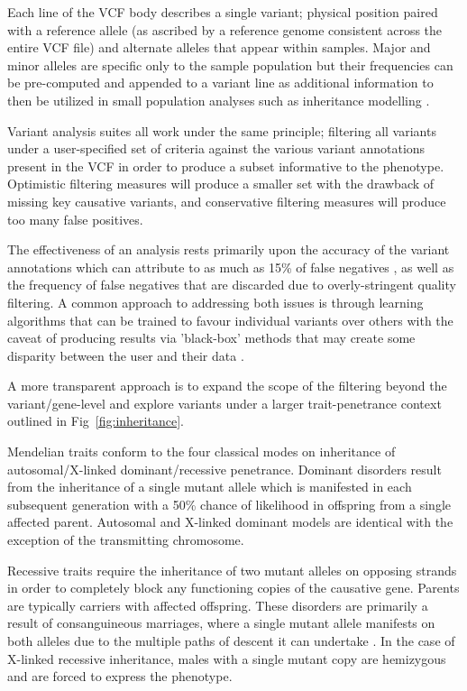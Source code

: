 Each line of the VCF body describes a single variant; physical position paired with a reference allele (as ascribed by a reference genome consistent across the entire VCF file) and alternate alleles that appear within samples. Major and minor alleles are specific only to the sample population but their frequencies can be pre-computed and appended to a variant line as additional information to then be utilized in small population analyses such as inheritance modelling \citep{danecek2011variant}.

Variant analysis suites all work under the same principle; filtering all variants under a user-specified set of criteria against the various variant annotations present in the VCF in order to produce a subset informative to the phenotype. Optimistic filtering measures will produce a smaller set with the drawback of missing key causative variants, and conservative filtering measures will produce too many false positives.

The effectiveness of an analysis rests primarily upon the accuracy of the variant annotations which can attribute to as much as 15\% of false negatives \citep{warden2014detailed}, as well as the frequency of false negatives that are discarded due to overly-stringent quality filtering. A common approach to addressing both issues is through learning algorithms that can be trained to favour individual variants over others with the caveat of producing results via 'black-box' methods that may create some disparity between the user and their data \citep{pabinger2014survey}. 

A more transparent approach is to expand the scope of the filtering beyond the variant/gene-level and explore variants under a larger trait-penetrance context outlined in Fig~\ref{fig:inheritance}. 

Mendelian traits conform to the four classical modes on inheritance of autosomal/X-linked dominant/recessive penetrance. Dominant disorders result from the inheritance of a single mutant allele which is manifested in each subsequent generation with a 50\% chance of likelihood in offspring from a single affected parent. Autosomal and X-linked dominant models are identical with the exception of the transmitting chromosome.

Recessive traits require the inheritance of two mutant alleles on opposing strands in order to completely block any functioning copies of the causative gene. Parents are typically carriers with affected offspring. These disorders are primarily a result of consanguineous marriages, where a single mutant allele manifests on both alleles due to the multiple paths of descent it can undertake \cite{lander2001initial}. In the case of X-linked recessive inheritance, males with a single mutant copy are hemizygous and are forced to express the phenotype.

